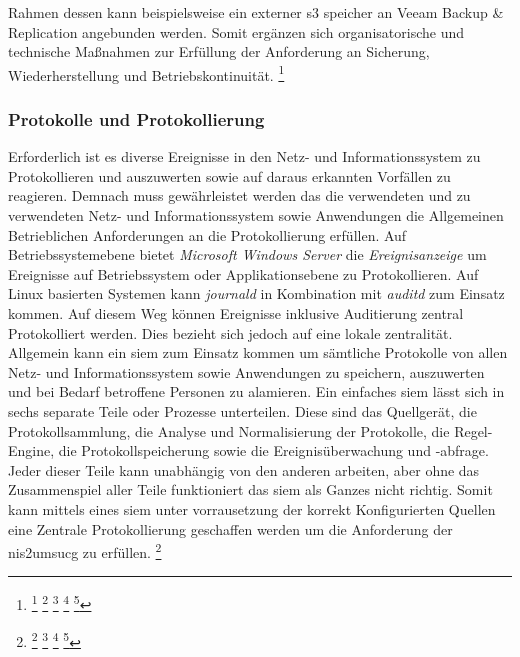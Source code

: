 \documentclass[11pt,a4paper,hidelinks]{article}   %
\begin{document}
Rahmen dessen kann beispielsweise ein externer \gls{s3} speicher an Veeam Backup & Replication angebunden werden. Somit ergänzen sich organisatorische und technische Maßnahmen zur Erfüllung der Anforderung an Sicherung, Wiederherstellung und Betriebskonti­nuität.
            \footnote{
                \footcite[Vgl. S. 1 - 3][]{9781931332767}
                \footcite[Vgl. S. 244][]{9781849285384}
                \footcite[Vgl. S. 228 – 230][]{9781118094839}
                \footcite[Vgl. S. 3, 24 - 33][]{9781837630097} %
                \footcite[Vgl. S. 3 , 39 - 40, 47 - 48][]{9781803236810} %
            }
            \subsubsection{Protokolle und Protokollierung}
            Erforderlich ist es diverse Ereignisse in den Netz- und Informationssystem zu Protokollieren und auszuwerten sowie auf daraus erkannten Vorfällen zu reagieren. Demnach muss gewährleistet werden das die verwendeten und zu verwendeten Netz- und Informationssystem sowie Anwendungen die Allgemeinen Betrieblichen Anforderungen an die Protokollierung erfüllen. Auf Betriebssystemebene bietet \emph{Microsoft Windows Server} die \emph{Ereignisanzeige} um Ereignisse auf Betriebssystem oder Applikationsebene zu Protokollieren. Auf Linux basierten Systemen kann \emph{journald} in Kombination mit \emph{auditd} zum Einsatz kommen. Auf diesem Weg können Ereignisse inklusive Auditierung zentral Protokolliert werden. Dies bezieht sich jedoch auf eine lokale zentralität. Allgemein kann ein \gls{siem} zum Einsatz kommen um sämtliche Protokolle von allen Netz- und Informationssystem sowie Anwendungen zu speichern, auszuwerten und bei Bedarf betroffene Personen zu alamieren. Ein einfaches \gls{siem} lässt sich in sechs separate Teile oder Prozesse unterteilen. Diese sind das Quellgerät, die Protokollsammlung, die Analyse und Normalisierung der Protokolle, die Regel-Engine, die Protokollspeicherung sowie die Ereignisüberwachung und -abfrage. Jeder dieser Teile kann unabhängig von den anderen arbeiten, aber ohne das Zusammenspiel aller Teile funktioniert das \gls{siem} als Ganzes nicht richtig. Somit kann mittels eines \gls{siem} unter vorrausetzung der korrekt Konfigurierten Quellen eine Zentrale Protokollierung geschaffen werden um die Anforderung der \gls{nis2umsucg} zu erfüllen.
            \footnote{
                \footcite[Vgl. S. 106 - 107][]{iso27002-2022}
                \footcite[Vgl. S. 463 - 469, 516 - 519][]{9781838981778}
                \footcite[Vgl. S. 529 - 533][]{9781305078628}
                \footcite[Vgl. S. 78 - 91][]{9780071701082}
            }
\end{document}

